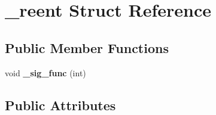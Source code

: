 \hypertarget{struct__reent}{}\section{\+\_\+reent Struct Reference}
\label{struct__reent}
\subsection*{Public Member Functions}
\begin{DoxyCompactItemize}
\item 
void {\bfseries \+\_\+sig\+\_\+func} (int)\hypertarget{struct__reent_a08b5a867727a46f3ba59b69b8f71c35a}{}\label{struct__reent_a08b5a867727a46f3ba59b69b8f71c35a}

\end{DoxyCompactItemize}
\subsection*{Public Attributes}
